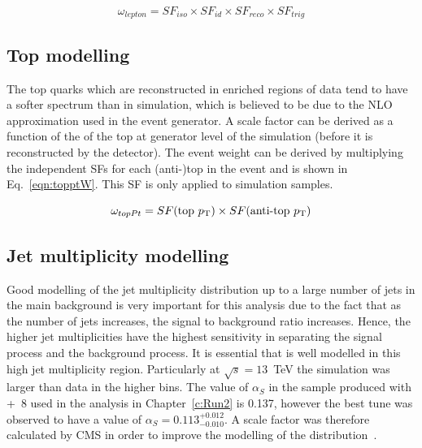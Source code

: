 \begin{equation}
\omega_{lepton} = SF_{iso}\times SF_{id}\times SF_{reco}\times SF_{trig}
\label{eqn:leptonW}
\end{equation}

\subsection{Top \pt modelling}

The top quarks which are reconstructed in \ttbar enriched regions of data tend to have a softer \pt spectrum than in \ttbar simulation, which is believed to be due to the NLO approximation used in the event generator. A scale factor can be derived as a function of the \pt of the top at generator level of the simulation (before it is reconstructed by the detector). The event weight can be derived by multiplying the independent SFs for each (anti-)top in the event and is shown in Eq.~\ref{eqn:topptW}. This SF is only applied to \ttbar simulation samples.

\begin{equation}
\omega_{topPt} = SF(\textrm{top}~p_{\mathrm{T}})\times SF(\textrm{anti-top}~p_{\mathrm{T}})
\label{eqn:topptW}
\end{equation}

\subsection{Jet multiplicity modelling \label{subsec:alphaS}}
Good modelling of the jet multiplicity distribution up to a large number of jets in the main \ttbar background is very important for this analysis due to the fact that as the number of jets increases, the signal to background ratio increases. Hence, the higher jet multiplicities have the highest sensitivity in separating the signal \tttt process and the background \ttbar process. It is essential that \ttbar is well modelled in this high jet multiplicity region. 
Particularly at $\sqrt{s}=13$~TeV the simulation was larger than data in the higher \njets bins. The value of $\alpha_S$ in the \ttbar sample produced with \POWHEG+\PYTHIA~8 used in the analysis in Chapter~\ref{c:Run2} is 0.137, however the best tune was observed to have a value of $\alpha_S=0.113^{+0.012}_{-0.010}$. A scale factor was therefore calculated by CMS in order to improve the modelling of the \njets distribution~\cite{Khachatryan:2015mva}. 

